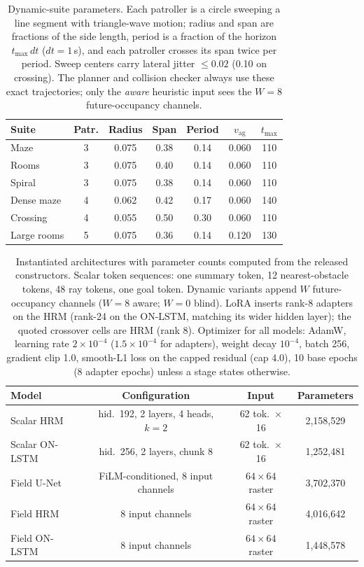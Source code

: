 \documentclass[letterpaper]{article} %
\begin{document}
\begin{table}[h]
\centering
\scriptsize
\setlength{\tabcolsep}{2.5pt}
\begin{tabular}{@{}lcccccc@{}}
\toprule
Suite & Patr. & Radius & Span & Period & $v_{\mathrm{ag}}$ & $t_{\max}$ \\
\midrule
Maze & 3 & 0.075 & 0.38 & 0.14 & 0.060 & 110 \\
Rooms & 3 & 0.075 & 0.40 & 0.14 & 0.060 & 110 \\
Spiral & 3 & 0.075 & 0.38 & 0.14 & 0.060 & 110 \\
Dense maze & 4 & 0.062 & 0.42 & 0.17 & 0.060 & 140 \\
Crossing & 4 & 0.055 & 0.50 & 0.30 & 0.060 & 110 \\
Large rooms & 5 & 0.075 & 0.36 & 0.14 & 0.120 & 130 \\
\bottomrule
\end{tabular}
\caption{Dynamic-suite parameters. Each patroller is a circle sweeping a line segment with triangle-wave motion; radius and span are fractions of the side length, period is a fraction of the horizon $t_{\max}\,dt$ ($dt{=}1$\,s), and each patroller crosses its span twice per period. Sweep centers carry lateral jitter $\leq 0.02$ (0.10 on crossing). The planner and collision checker always use these exact trajectories; only the \emph{aware} heuristic input sees the $W{=}8$ future-occupancy channels.}
\label{tab:dynspec}
\end{table}

\begin{table}[h]
\centering
\scriptsize
\setlength{\tabcolsep}{2.5pt}
\begin{tabular}{@{}lccc@{}}
\toprule
Model & Configuration & Input & Parameters \\
\midrule
Scalar HRM & hid.\ 192, 2 layers, 4 heads, $k{=}2$ & 62 tok.\ $\times$ 16 & 2{,}158{,}529 \\
Scalar ON-LSTM & hid.\ 256, 2 layers, chunk 8 & 62 tok.\ $\times$ 16 & 1{,}252{,}481 \\
Field U-Net & FiLM-conditioned, 8 input channels & $64{\times}64$ raster & 3{,}702{,}370 \\
Field HRM & 8 input channels & $64{\times}64$ raster & 4{,}016{,}642 \\
Field ON-LSTM & 8 input channels & $64{\times}64$ raster & 1{,}448{,}578 \\
\bottomrule
\end{tabular}
\caption{Instantiated architectures with parameter counts computed from the released constructors. Scalar token sequences: one summary token, 12 nearest-obstacle tokens, 48 ray tokens, one goal token. Dynamic variants append $W$ future-occupancy channels ($W{=}8$ aware; $W{=}0$ blind). LoRA inserts rank-8 adapters on the HRM (rank-24 on the ON-LSTM, matching its wider hidden layer); the quoted crossover cells are HRM (rank 8). Optimizer for all models: AdamW, learning rate $2{\times}10^{-4}$ ($1.5{\times}10^{-4}$ for adapters), weight decay $10^{-4}$, batch 256, gradient clip 1.0, smooth-L1 loss on the capped residual (cap 4.0), 10 base epochs (8 adapter epochs) unless a stage states otherwise.}
\label{tab:archspec}
\end{table}
\end{document}
